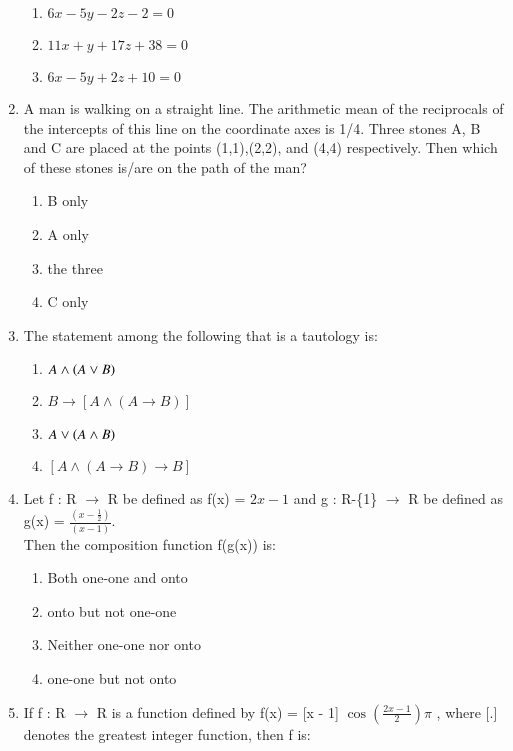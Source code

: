 \documentclass[journal]{IEEEtran}
\numberwithin{equation}{enumi}
\numberwithin{figure}{enumi}
\begin{document}
\begin{enumerate}
\begin{enumerate}
        \item $6x - 5y - 2z - 2 = 0$
        \item $11x + y + 17z + 38 = 0$
        \item $6x - 5y + 2z + 10 = 0$
    \end{enumerate} 
    \item A man is walking on a straight line. The arithmetic mean of the reciprocals of the intercepts of this line on the coordinate axes is 1/4. Three stones A, B and C are placed at the points (1,1),(2,2), and (4,4) respectively. Then which of these stones is/are on the path of the man? \\
     \begin{multicols}{4}
    \begin{enumerate}
        \item B only 
        \item A only
        \item the three
        \item C only
    \end{enumerate} 
    \end{multicols}
    \item The statement among the following that is a tautology is: \\
    \begin{enumerate}
        \item $A \land \left(A \lor B\right)$
        \item $B \rightarrow [A \land (A \rightarrow B)]$
        \item $A \lor \left(A \land B\right)$
        \item $[A \land (A \rightarrow B) \rightarrow B]$
    \end{enumerate}
    \item Let f : R $\rightarrow$ R be defined as f(x) = $2x-1$ and g : R-\{1\} $\rightarrow$ R be defined as g(x) = $\frac{(x-\frac{1}{2})}{(x-1)}$.\\Then the composition function f(g(x)) is: \\
    \begin{enumerate}
        \item Both one-one and onto
        \item onto but not one-one
        \item Neither one-one nor onto
        \item one-one but not onto
    \end{enumerate}
    \item If f : R $\rightarrow$ R is a function defined by f(x) = [x - 1] $\cos{(\frac{2x - 1}{2})\pi}$ , where [.] denotes the greatest integer function, then f is: \\

\end{enumerate}
\end{document}
